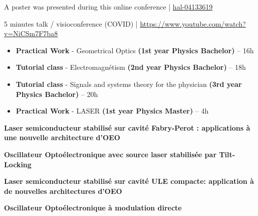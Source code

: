 \documentclass[9pt,a4paper,academicons]{altacv}
\begin{document}
\begin{fullwidth}
\medskip

{A poster was presented during this online conference} | \href{https://hal.science/hal-04133619}{hal-04133619}

\newpage


    
{}

\smallskip

{5 minutes talk / visioconference (COVID)} | {\color{red}\faYoutubePlay}  \href{https://www.youtube.com/watch?v=NiCSm7F7ba8}{https://www.youtube.com/watch?v=NiCSm7F7ba8}





 
\medskip


  \begin{itemize}
    \item \textbf{Practical Work} - Geometrical Optics \textbf{(1st year Physics Bachelor)} -- 16h
    \item \textbf{Tutorial class} - Electromagnétism \textbf{(2nd year Physics Bachelor)} -- 18h
    \item \textbf{Tutorial class} - Signals and systems theory for the physician \textbf{(3rd year Physics Bachelor)} -- 20h
    \item \textbf{Practical Work} - LASER \textbf{(1st year Physics Master)} -- 4h
  \end{itemize}

  \medskip
{}
    
\vspace{-0.5em}\textbf{Laser semiconducteur stabilisé sur cavité Fabry-Perot : applications à une
nouvelle architecture d'OEO}

\divider


\vspace{-0.5em}\textbf{Oscillateur Optoélectronique avec source laser stabilisée par Tilt-Locking}

\divider
    
\vspace{-0.5em}\textbf{Laser semiconducteur stabilisé sur
	cavité ULE compacte: application à
	de nouvelles architectures d’OEO}

\divider

    
\vspace{-0.5em}\textbf{Oscillateur Optoélectronique à modulation directe}


    
    
\end{fullwidth}
\end{document}
